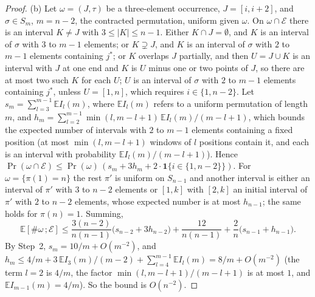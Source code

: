 \documentclass[11pt,a4paper]{article}
\theoremstyle{plain}
\theoremstyle{definition}
\theoremstyle{remark}
\begin{document}
\begin{proof}
(b) Let $\omega=(J,\tau)$ be a three-element occurrence, $J=[i,i+2]$, and $\sigma\in S_m$, $m=n-2$, the contracted permutation, uniform given $\omega$. On $\omega\cap\mathcal E$ there is an interval $K\ne J$ with $3\le|K|\le n-1$. Either $K\cap J=\emptyset$, and $K$ is an interval of $\sigma$ with $3$ to $m-1$ elements; or $K\supsetneq J$, and $K$ is an interval of $\sigma$ with $2$ to $m-1$ elements containing $j^*$; or $K$ overlaps $J$ partially, and then $U=J\cup K$ is an interval with $J$ at one end and $K$ is $U$ minus one or two points of $J$, so there are at most two such $K$ for each $U$; $U$ is an interval of $\sigma$ with $2$ to $m-1$ elements containing $j^*$, unless $U=[1,n]$, which requires $i\in\{1,n-2\}$. Let $s_m=\sum_{l=3}^{m-1}\mathbb EI_l(m)$, where $\mathbb EI_l(m)$ refers to a uniform permutation of length $m$, and $h_m=\sum_{l=2}^{m-1}\min(l,m-l+1)\,\mathbb EI_l(m)/(m-l+1)$, which bounds the expected number of intervals with $2$ to $m-1$ elements containing a fixed position (at most $\min(l,m-l+1)$ windows of $l$ positions contain it, and each is an interval with probability $\mathbb EI_l(m)/(m-l+1)$). Hence $\Pr(\omega\cap\mathcal E)\le\Pr(\omega)\,(s_m+3h_m+2\cdot\mathbf 1\{i\in\{1,n-2\}\})$. For $\omega=\{\pi(1)=n\}$ the rest $\pi'$ is uniform on $S_{n-1}$ and another interval is either an interval of $\pi'$ with $3$ to $n-2$ elements or $[1,k]$ with $[2,k]$ an initial interval of $\pi'$ with $2$ to $n-2$ elements, whose expected number is at most $h_{n-1}$; the same holds for $\pi(n)=1$. Summing,
\[
\mathbb E[\#\omega\,;\mathcal E]\le\frac{3(n-2)}{n(n-1)}\bigl(s_{n-2}+3h_{n-2}\bigr)+\frac{12}{n(n-1)}+\frac2n\bigl(s_{n-1}+h_{n-1}\bigr).
\]
By Step~2, $s_m=10/m+O(m^{-2})$, and $h_m\le4/m+3\,\mathbb EI_3(m)/(m-2)+\sum_{l=4}^{m-1}\mathbb EI_l(m)=8/m+O(m^{-2})$ (the term $l=2$ is $4/m$, the factor $\min(l,m-l+1)/(m-l+1)$ is at most $1$, and $\mathbb EI_{m-1}(m)=4/m$). So the bound is $O(n^{-2})$.
\end{proof}
\end{document}

